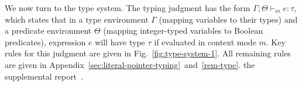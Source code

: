 We now turn to the \lang type system.
%
The typing judgment has the form $\Gamma;\Theta\vdash_m e : \tau$,
which states that in a type environment $\Gamma$ (mapping variables to
their types) and a predicate environment $\Theta$ (mapping integer-typed
variables to Boolean predicates), expression $e$ will have type $\tau$ if evaluated
in context mode $m$. Key rules for this judgment are given in
Fig.~\ref{fig:type-system-1}.
All remaining rules
are given in
\iftr
Appendix~\ref{sec:literal-pointer-typing}~and~\ref{rem-type}.
\else
the supplemental report~\cite{checkedc-tech-report}.
\fi

